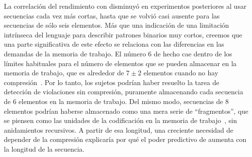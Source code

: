 La correlación del rendimiento con \mdlbin disminuyó en experimentos posteriores al usar secuencias cada vez más cortas, hasta que se volvió casi ausente para las secuencias de sólo seis elementos. Más que una indicación de una limitación intrínseca del lenguaje para describir patrones binarios muy cortos, creemos que una parte significativa de este efecto se relaciona con las diferencias en las demandas de la memoria de trabajo. El número 6 de hecho cae dentro de los límites habituales para el número de elementos que se pueden almacenar en la memoria de trabajo, que es alrededor de $7 \pm 2$ elementos cuando no hay compresión~\cite{f16,f29}. Por lo tanto, los sujetos podrían haber resuelto la tarea de detección de violaciones sin compresión, puramente almacenando cada secuencia de 6 elementos en la memoria de trabajo. Del mismo modo, secuencias de 8 elementos podrían haberse almacenado como una mera serie de ``fragmentos'', que se piensen como las unidades de la codificación en la memoria de trabajo~\cite{f16,f86,f108,f109}, sin anidamientos recursivos. A partir de esa longitud, una creciente necesidad de depender de la compresión explicaría por qué el poder predictivo de \lot aumenta con la longitud de la secuencia.


